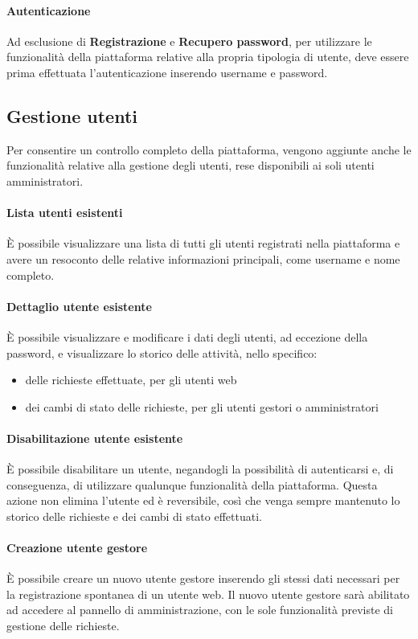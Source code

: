 \paragraph{Autenticazione}
Ad esclusione di \textbf{Registrazione} e \textbf{Recupero password}, per utilizzare
le funzionalità della piattaforma relative alla propria tipologia di utente,
deve essere prima effettuata l'autenticazione inserendo username e password.


\subsection{Gestione utenti}
Per consentire un controllo completo della piattaforma, vengono aggiunte anche
le funzionalità relative alla gestione degli utenti, rese disponibili ai soli
utenti amministratori.

\paragraph{Lista utenti esistenti}
È possibile visualizzare una lista di tutti gli utenti registrati nella piattaforma
e avere un resoconto delle relative informazioni principali, come username e
nome completo.

\paragraph{Dettaglio utente esistente}
È possibile visualizzare e modificare i dati degli utenti, ad eccezione della
password, e visualizzare lo storico delle attività, nello specifico:
\begin{itemize}
	\item delle richieste effettuate, per gli utenti web
	\item dei cambi di stato delle richieste, per gli utenti gestori o amministratori
\end{itemize}

\paragraph{Disabilitazione utente esistente}
È possibile disabilitare un utente, negandogli la possibilità di autenticarsi e,
di conseguenza, di utilizzare qualunque funzionalità della piattaforma.
Questa azione non elimina l'utente ed è reversibile, così che venga sempre
mantenuto lo storico delle richieste e dei cambi di stato effettuati.

\paragraph{Creazione utente gestore}
È possibile creare un nuovo utente gestore inserendo gli stessi dati necessari
per la registrazione spontanea di un utente web. Il nuovo utente gestore sarà
abilitato ad accedere al pannello di amministrazione, con le sole
funzionalità previste di gestione delle richieste.


